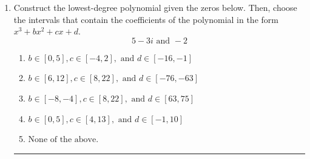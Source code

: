 \documentclass[14pt]{extbook}
\newcommand{\litem}[1]{\item#1\hspace*{-1cm}\rule{\textwidth}{0.4pt}}
\begin{document}
\begin{enumerate}
{\begin{enumerate}[label=\Alph*.]
\end{enumerate} }
\litem{
Construct the lowest-degree polynomial given the zeros below. Then, choose the intervals that contain the coefficients of the polynomial in the form $x^3+bx^2+cx+d$.\[ 5 - 3 i \text{ and } -2 \]\begin{enumerate}[label=\Alph*.]
\item \( b \in [0, 5], c \in [-4, 2], \text{ and } d \in [-16, -1] \)
\item \( b \in [6, 12], c \in [8, 22], \text{ and } d \in [-76, -63] \)
\item \( b \in [-8, -4], c \in [8, 22], \text{ and } d \in [63, 75] \)
\item \( b \in [0, 5], c \in [4, 13], \text{ and } d \in [-1, 10] \)
\item \( \text{None of the above.} \)


\end{enumerate}}
\end{enumerate}
\end{document}
